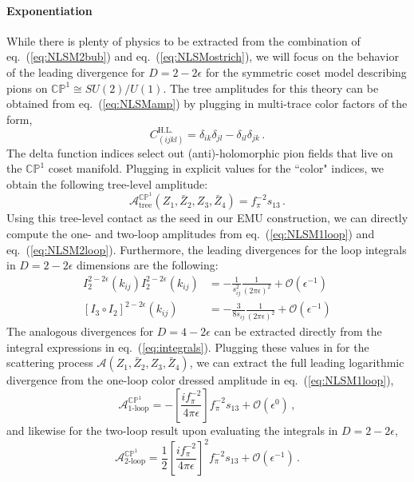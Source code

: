 \documentclass[11pt,letter]{article}
\newcommand{\cHL}[0]{C^{\text{H.L.}}}
\def\eqn#1{eq.~(\ref{#1})}
\begin{document}
\paragraph{\textbf{Exponentiation}} While there is plenty of physics to be extracted from the combination of \eqn{eq:NLSM2bub} and \eqn{eq:NLSMostrich}, we will focus on the behavior of the leading divergence for $D=2-2\epsilon$ for the symmetric coset model describing pions on $\mathbb{CP}^1\cong SU(2) /U(1)$. The tree amplitudes for this theory can be obtained from \eqn{eq:NLSMamp} by plugging in multi-trace color factors of the form,
\begin{equation}
\cHL_{(ijkl)} = \delta_{ik}\delta_{jl} -\delta_{il}\delta_{jk} \,.
\end{equation}
The delta function indices select out (anti)-holomorphic pion fields that live on the $\mathbb{CP}^1$ coset manifold. Plugging in explicit values for the ``color" indices, we obtain the following tree-level amplitude:
\begin{equation}
\mathcal{A}^{\mathbb{CP}^1}_{\text{tree}}(Z_1,\bar{Z}_2,Z_3,\bar{Z}_4) = f_\pi^{-2}s_{13}\,.
\end{equation}
Using this tree-level contact as the seed in our EMU construction, we can directly compute the one- and two-loop amplitudes from \eqn{eq:NLSM1loop} and \eqn{eq:NLSM2loop}. Furthermore, the leading divergences for the loop integrals in $D=2-2\epsilon$ dimensions are the following:
\begin{align}
I_2^{2-2\epsilon}(k_{ij})I_2^{2-2\epsilon}(k_{ij}) &= -\frac{1}{s_{ij }^2}\frac{1}{(2\pi \epsilon)^2} + \mathcal{O}(\epsilon^{-1}) 
\\
 [I_3\circ I_2]^{2-2\epsilon}{(k_{ij})} &= -\frac{3}{8s_{ij }}\frac{1}{(2\pi \epsilon)^2} + \mathcal{O}(\epsilon^{-1}) 
\end{align}
The analogous divergences for $D=4-2\epsilon$ can be extracted directly from the integral expressions in \eqn{eq:integrals}. Plugging these values in for the scattering process $\mathcal{A}(Z_1,\bar{Z}_2,Z_3,\bar{Z}_4) $, we can extract the full leading logarithmic divergence from the one-loop color dressed amplitude in \eqn{eq:NLSM1loop},
\begin{equation}\label{eq:1loopCP1}
\mathcal{A}^{\mathbb{CP}^1}_{\text{1-loop}} = - \left[\frac{if_{\pi}^{-2} }{4\pi \epsilon}\right]f_\pi^{-2}s_{13}+\mathcal{O}(\epsilon^0)\,,
\end{equation}
and likewise for the two-loop result upon evaluating the integrals in $D=2-2\epsilon$,
\begin{equation}
\mathcal{A}^{\mathbb{CP}^1}_{\text{2-loop}} = \frac{1}{2} \left[\frac{if_{\pi}^{-2} }{4\pi \epsilon}\right]^2f_\pi^{-2}s_{13} +\mathcal{O}(\epsilon^{-1})\,.
\end{equation}
\end{document}
